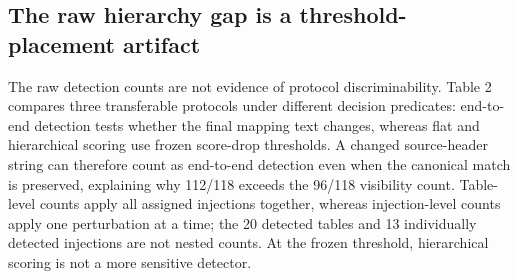 \documentclass[a4paper,twoside]{article}
\begin{document}
\subsection{The raw hierarchy gap is a threshold-placement artifact}
The raw detection counts are not evidence of protocol discriminability. Table 2 compares three transferable protocols under different decision predicates: end-to-end detection tests whether the final mapping text changes, whereas flat and hierarchical scoring use frozen score-drop thresholds. A changed source-header string can therefore count as end-to-end detection even when the canonical match is preserved, explaining why 112/118 exceeds the 96/118 visibility count. Table-level counts apply all assigned injections together, whereas injection-level counts apply one perturbation at a time; the 20 detected tables and 13 individually detected injections are not nested counts. At the frozen threshold, hierarchical scoring is not a more sensitive detector.
\begin{table}[htbp]
\centering
\caption{Protocol-level detection under different decision predicates.}
\small
\hfuzz=3pt
\setlength{\tabcolsep}{0.5pt}
\end{table}
\end{document}
